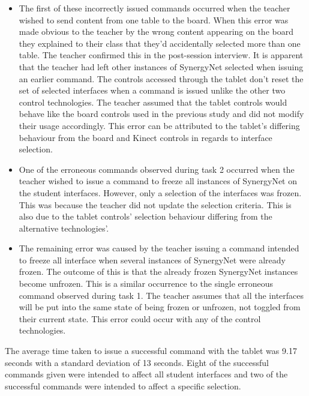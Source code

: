 \documentclass[manuscript, review, screen]{acmart}
\begin{document}
\begin{itemize}
\item The first of these incorrectly issued commands occurred when the teacher wished to send content from one table to the board.
When this error was made obvious to the teacher by the wrong content appearing on the board they explained to their class that they'd accidentally selected more than one table.
The teacher confirmed this in the post-session interview.
It is apparent that the teacher had left other instances of SynergyNet selected when issuing an earlier command.
The controls accessed through the tablet don't reset the set of selected interfaces when a command is issued unlike the other two control technologies.
The teacher assumed that the tablet controls would behave like the board controls used in the previous study and did not modify their usage accordingly.
This error can be attributed to the tablet's differing behaviour from the board and Kinect controls in regards to interface selection.

\item One of the erroneous commands observed during task 2 occurred when the teacher wished to issue a command to freeze all instances of SynergyNet on the student interfaces.
However, only a selection of the interfaces was frozen.
This was because the teacher did not update the selection criteria.
This is also due to the tablet controls' selection behaviour differing from the alternative technologies'.

\item The remaining error was caused by the teacher issuing a command intended to freeze all interface when several instances of SynergyNet were already frozen.
The outcome of this is that the already frozen SynergyNet instances become unfrozen.
This is a similar occurrence to the single erroneous command observed during task 1.
The teacher assumes that all the interfaces will be put into the same state of being frozen or unfrozen, not toggled from their current state.
This error could occur with any of the control technologies.
\end{itemize}


The average time taken to issue a successful command with the tablet was 9.17 seconds with a standard deviation of 13 seconds.
Eight of the successful commands given were intended to affect all student interfaces and two of the successful commands were intended to affect a specific selection.
\end{document}
